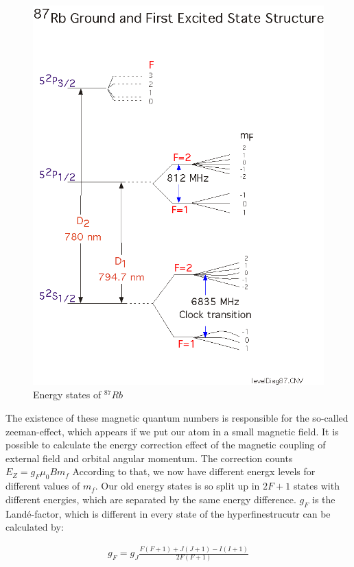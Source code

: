 \begin{figure}[htbp] 
     \includegraphics[scale=0.7]{level87.png}
  \caption{Energy states of $^{87}Rb$}
  \label{states}
\end{figure}

The existence of these magnetic quantum numbers is responsible for the so-called zeeman-effect, which appears if we put our atom in a small magnetic field. It is possible to calculate the energy correction effect of the magnetic coupling of external field and orbital angular momentum. The correction counts $E_Z=g_F\mu_0 Bm_f$
According to that, we now have different energx levels for different values of $m_f$. Our old energy states is so split up in $2F+1$ states with different energies, which are separated by the same energy difference. $g_F$ is the Landé-factor, which is different in every state of the hyperfinestrucutr can be calculated by:

\begin{align}
g_F=g_J \frac{F\left(F+1\right)+J\left(J+1\right)-I\left(I+1\right)}{2F\left(F+1\right)}
\end{align}

